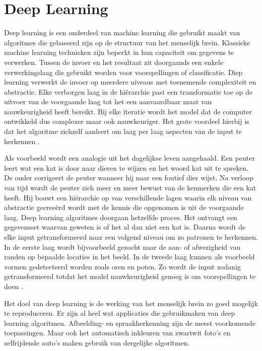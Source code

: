 \section{Deep Learning}
\label{sec:Deep Learning}
Deep learning is een onderdeel van machine learning die gebruikt maakt van algoritmes die gebaseerd zijn op de structuur van het menselijk brein. Klassieke machine learning technieken zijn beperkt in hun capaciteit om gegevens te verwerken. Tussen de invoer en het resultaat zit doorgaands een enkele verwerkingslaag die gebruikt worden voor voorspellingen of classificatie.  Diep learning verwerkt de invoer op meerdere niveaus met toenemende complexiteit en abstractie. Elke verborgen laag in de hiërarchie past een transformatie toe op de uitvoer van de voorgaande laag tot het een aanvaardbaar maat van nauwkeurigheid heeft bereikt. Bij elke iteratie wordt het model dat de computer ontwikkeld dus complexer maar ook nauwkeuriger. Het grote voordeel hierbij is dat het algoritme zichzelf aanleert om laag per laag aspecten van de input te herkennen \autocite{toronto}.

Als voorbeeld wordt een analogie uit het dagelijkse leven aangehaald. Een peuter leert wat een kat is door naar dieren te wijzen en het woord kat uit te spreken. De ouder corrigeert de peuter wanneer hij naar een foutief dier wijst. Na verloop van tijd wordt de peuter zich meer en meer bewust van de kenmerken die een kat heeft. Hij bouwt een hiërarchie op van verschillende lagen waarin elk niveau van abstractie gecreeërd wordt met de kennis die  opgenomen is uit de voorgaande laag. Deep learning algoritmes doorgaan hetzelfde proces. Het ontvangt een gegevensset waarvan geweten is of het al dan niet een kat is. Daarna wordt de elke input getransformeerd naar een volgend niveau om zo patronen te herkennen.  In de eerste laag wordt bijvoorbeeld gezocht naar de aan- of afwezigheid van randen op bepaalde locaties in het beeld. In de tweede laag kunnen als voorbeeld vormen gedetecteerd worden zoals oren en poten. Zo wordt de input zodanig getransformeerd totdat het model nauwkeurigheid genoeg is om voorspellingen te doen \autocite{techtarget}.

Het doel van deep learning is de werking van het menselijk brein zo goed mogelijk te reproduceren. Er zijn al heel wat applicaties die gebruikmaken van deep learning algoritmen. Afbeelding- en spraakherkenning zijn de meest voorkomende toepassingen. Maar ook het automatisch inkleuren van zwartwit foto’s en zelfrijdende auto’s maken gebruik van dergelijke algoritmen. 

